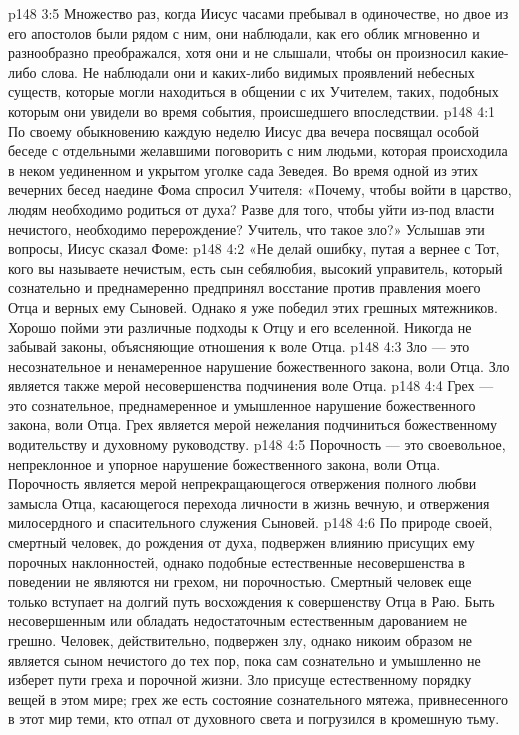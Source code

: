 \vs p148 3:5 Множество раз, когда Иисус часами пребывал в одиночестве, но двое из его апостолов были рядом с ним, они наблюдали, как его облик мгновенно и разнообразно преображался, хотя они и не слышали, чтобы он произносил какие\hyp{}либо слова. Не наблюдали они и каких\hyp{}либо видимых проявлений небесных существ, которые могли находиться в общении с их Учителем, таких, подобных которым они увидели во время события, происшедшего впоследствии.
\vs p148 4:1 По своему обыкновению каждую неделю Иисус два вечера посвящал особой беседе с отдельными желавшими поговорить с ним людьми, которая происходила в неком уединенном и укрытом уголке сада Зеведея. Во время одной из этих вечерних бесед наедине Фома спросил Учителя: «Почему, чтобы войти в царство, людям необходимо родиться от духа? Разве для того, чтобы уйти из\hyp{}под власти нечистого, необходимо перерождение? Учитель, что такое зло?» Услышав эти вопросы, Иисус сказал Фоме:
\vs p148 4:2 \pc «Не делай ошибку, путая  а вернее с  Тот, кого вы называете нечистым, есть сын себялюбия, высокий управитель, который сознательно и преднамеренно предпринял восстание против правления моего Отца и верных ему Сыновей. Однако я уже победил этих грешных мятежников. Хорошо пойми эти различные подходы к Отцу и его вселенной. Никогда не забывай законы, объясняющие отношения к воле Отца.
\vs p148 4:3 Зло --- это несознательное и ненамеренное нарушение божественного закона, воли Отца. Зло является также мерой несовершенства подчинения воле Отца.
\vs p148 4:4 Грех --- это сознательное, преднамеренное и умышленное нарушение божественного закона, воли Отца. Грех является мерой нежелания подчиниться божественному водительству и духовному руководству.
\vs p148 4:5 Порочность --- это своевольное, непреклонное и упорное нарушение божественного закона, воли Отца. Порочность является мерой непрекращающегося отвержения полного любви замысла Отца, касающегося перехода личности в жизнь вечную, и отвержения милосердного и спасительного служения Сыновей.
\vs p148 4:6 По природе своей, смертный человек, до рождения от духа, подвержен влиянию присущих ему порочных наклонностей, однако подобные естественные несовершенства в поведении не являются ни грехом, ни порочностью. Смертный человек еще только вступает на долгий путь восхождения к совершенству Отца в Раю. Быть несовершенным или обладать недостаточным естественным дарованием не грешно. Человек, действительно, подвержен злу, однако никоим образом не является сыном нечистого до тех пор, пока сам сознательно и умышленно не изберет пути греха и порочной жизни. Зло присуще естественному порядку вещей в этом мире; грех же есть состояние сознательного мятежа, привнесенного в этот мир теми, кто отпал от духовного света и погрузился в кромешную тьму.
